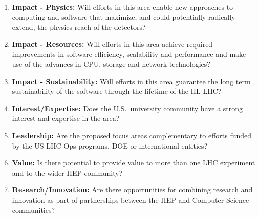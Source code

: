 
\begin{enumerate}

\item {\bf Impact - Physics:} Will efforts in this area enable new approaches to computing and software that maximize, and could potentially radically extend, the physics reach of the detectors?
\item {\bf Impact - Resources:} Will efforts in this area achieve required improvements in software efficiency, scalability and performance and make use of the advances in CPU, storage and network technologies?
\item {\bf Impact - Sustainability:} Will efforts in this area guarantee the long term sustainability of the software through the lifetime of the HL-LHC?
\item {\bf Interest/Expertise:} Does the U.S.\ university community have a strong interest and expertise in the area?
\item {\bf Leadership:} Are the proposed focus areas complementary to efforts funded by the US-LHC Ops programs, DOE or international entities?
\item {\bf Value:} Is there potential to provide value to more than one LHC experiment and to the wider HEP community?
\item {\bf Research/Innovation:} Are there opportunities for combining research and innovation as part of partnerships between the HEP and Computer Science communities?
\end{enumerate}



